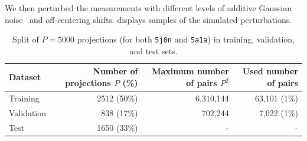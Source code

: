 We then perturbed the measurements with different levels of additive Gaussian noise~\cite{sorzano2004normalizing,shigematsu2013noise} and off-centering shifts. %
 displays samples of the simulated perturbations.

\begin{table}[ht!]
    \centering
    \begin{tabular}{lrrr}
        \toprule
        Dataset & Number of projections $P$ (\%) & Maximum number of pairs $P^2$ & Used number of pairs \\
        \midrule
        Training & 2512 (50\%) & 6,310,144 & 63,101 (1\%) \\
        Validation & 838 (17\%) & 702,244 & 7,022 (1\%) \\
        Test & 1650 (33\%) & - & - \\
        \bottomrule
    \end{tabular}
    \caption{%
        Split of $P=5000$ projections (for both \texttt{5j0n} and \texttt{5a1a}) in training, validation, and test sets.
    }\label{tab:dataset}
\end{table}

